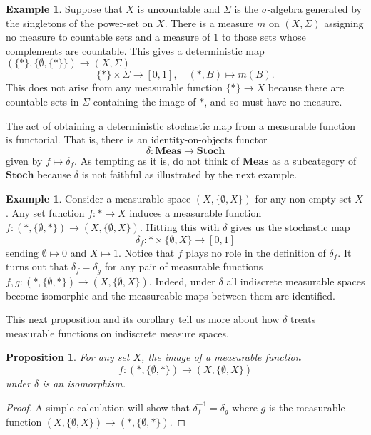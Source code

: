 \documentclass[11pt]{amsart}
\newcommand{\cat}[1]{\mathbf{#1}}
\newcommand{\from}{\colon}
\newtheorem{prop}[thm]{Proposition}
\theoremstyle{remark}
\theoremstyle{definition}
\newtheorem{ex}[thm]{Example}
\begin{document}
\begin{ex}
	Suppose that $X$ is uncountable and $\Sigma$ is the $\sigma$-algebra generated by the singletons of the power-set on $X$. There is a measure $m$ on $(X, \Sigma)$ assigning no measure to countable sets and a measure of $1$ to those sets whose complements are countable.  This gives a deterministic map $(\{\ast\},\{\emptyset, \{\ast\} \} ) \to (X,\Sigma)$ 
	\[
	\{\ast \} \times \Sigma \to [0,1],\quad (\ast,B) \mapsto m(B).
	\]
	This does not arise from any measurable function $\{\ast\} \to 
	X$ because there are countable sets in $\Sigma$ containing the image of $\ast$, and so must have no measure.  	
\end{ex}

The act of obtaining a deterministic stochastic map from a measurable function is functorial. That is, there is an identity-on-objects functor 
\begin{equation} \label{eq.deterministic functor}
	\delta \from \cat{Meas} \to \cat{Stoch}
\end{equation}
given by $f \mapsto \delta_f$.  As tempting as it is, do not think of $\cat{Meas}$ as a subcategory of $\cat{Stoch}$ because $\delta$ is not faithful as illustrated by the next example.

\begin{ex}
	Consider a measurable space 
	$(X,\{\emptyset,X\})$ for any non-empty 
	set $X$. Any set function $f \from \ast 
	\to X$ induces a measurable function $f 
	\from (\ast,\{\emptyset,\ast\}) \to 
	(X,\{\emptyset,X\})$. Hitting this with 
	$\delta$ gives us the stochastic map 
	\[
		\delta_f \from \ast \times \{\emptyset,X\} \to [0,1]
	\] 
	sending $\emptyset \mapsto 0$ and $X 
	\mapsto 1$. Notice that $f$ plays no role 
	in the definition of $\delta_f$. It turns 
	out that $\delta_f = \delta_g$ for any 
	pair of measurable functions $f,g \from 
	(\ast,\{\emptyset,\ast\}) \to 
	(X,\{\emptyset,X\})$. 	Indeed, under 
	$\delta$ all indiscrete measurable spaces 
	become isomorphic and the measureable maps 
	between them are identified.  
\end{ex}

This next proposition and its corollary tell 
us more about how $\delta$ treats measurable 
functions on indiscrete measure spaces. 

\begin{prop}
	For any set $X$, the image of a measurable function
	\[
	f \from (\ast,\{\emptyset,\ast\}) \to (X,\{\emptyset,X\})
	\] 
	under $\delta$ is an isomorphism.
\end{prop}
\begin{proof}
	A simple calculation will show that $\delta_f^{-1} = \delta_g$ where $g$ is the measurable function $(X,\{\emptyset,X\}) \to (\ast,\{\emptyset,\ast\})$. 
\end{proof}
\end{document}
